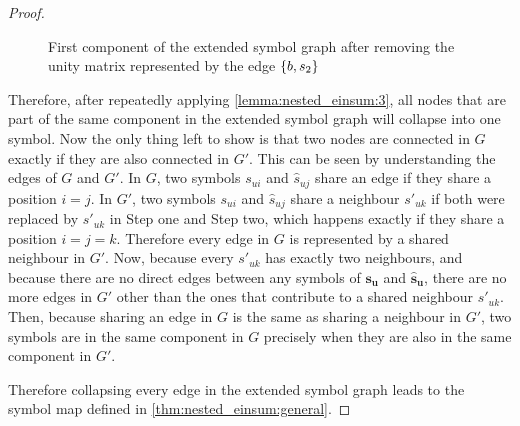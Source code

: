 \begin{proof}
\begin{figure}[h]
\begin{tikzpicture}[semithick, scale=0.6]
        \end{tikzpicture}
        \caption{First component of the extended symbol graph after removing the unity matrix represented by the edge $\smallset{b, s_2}$}
        \label{fig:nested_expressions:collapsed_extended_symbol_graph}
    \end{figure}

    Therefore, after repeatedly applying \cref{lemma:nested_einsum:3},
    all nodes that are part of the same component in the extended symbol graph will collapse into one symbol.
    Now the only thing left to show is that two nodes are connected in $G$ exactly if they are also connected in $G'$.
    This can be seen by understanding the edges of $G$ and $G'$.
    In $G$, two symbols $s_{ui}$ and $\hat{s}_{uj}$ share an edge if they share a position $i = j$.
    In $G'$, two symbols $s_{ui}$ and $\hat{s}_{uj}$ share a neighbour $s'_{uk}$ if both were replaced by $s'_{uk}$ in Step one and Step two,
    which happens exactly if they share a position $i = j = k$.
    Therefore every edge in $G$ is represented by a shared neighbour in $G'$.
    Now, because every $s'_{uk}$ has exactly two neighbours, and because there are no direct edges between any symbols of $\bm{s_u}$ and $\bm{\hat{s}_u}$, there are no more edges in $G'$ other than the ones that contribute to a shared neighbour $s'_{uk}$.
    Then, because sharing an edge in $G$ is the same as sharing a neighbour in $G'$, two symbols are in the same component in $G$ precisely when they are also in the same component in $G'$.

    Therefore collapsing every edge in the extended symbol graph leads to the symbol map defined in \cref{thm:nested_einsum:general}.
\end{proof}